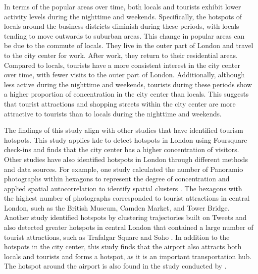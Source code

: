 \documentclass{article}
\theoremstyle{remark}
\begin{document}
In terms of the popular areas over time, both locals and tourists exhibit lower activity levels during the nighttime and weekends. Specifically, the hotspots of locals around the business districts diminish during these periods, with locals tending to move outwards to suburban areas. This change in popular areas can be due to the commute of locals. They live in the outer part of London and travel to the city center for work. After work, they return to their residential areas. Compared to locals, tourists have a more consistent interest in the city center over time, with fewer visits to the outer part of London. Additionally, although less active during the nighttime and weekends, tourists during these periods show a higher proportion of concentration in the city center than locals. This suggests that tourist attractions and shopping streets within the city center are more attractive to tourists than to locals during the nighttime and weekends.

The findings of this study align with other studies that have identified tourism hotspots. This study applies \acrshort{kde} to detect hotspots in London using Foursquare check-ins and finds that the city center has a higher concentration of visitors. Other studies have also identified hotspots in London through different methods and data sources. For example, one study calculated the number of Panoramio photographs within hexagons to represent the degree of concentration and applied spatial autocorrelation to identify spatial clusters \citep{garcia-palomares_identification_2015}. The hexagons with the highest number of photographs corresponded to tourist attractions in central London, such as the British Museum, Camden Market, and Tower Bridge. Another study identified hotspots by clustering trajectories built on Tweets and also detected greater hotspots in central London that contained a large number of tourist attractions, such as Trafalgar Square and Soho  \citep{ma_exploring_2020}. In addition to the hotspots in the city center, this study finds that the airport also attracts both locals and tourists and forms a hotspot, as it is an important transportation hub. The hotspot around the airport is also found in the study conducted by \cite{su_analysing_2020}.
\end{document}
